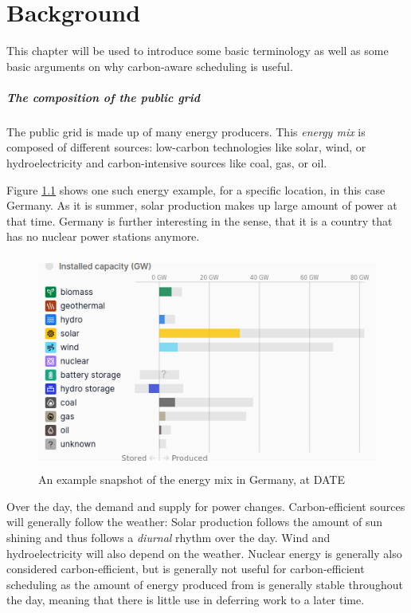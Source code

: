 \chapter{Background}

This chapter will be used to introduce some basic terminology as well as some basic arguments on why carbon-aware scheduling is useful.

\paragraph{The composition of the public grid}
The public grid is made up of many energy producers. This \emph{energy mix} is composed of different sources: low-carbon technologies like solar, wind, or hydroelectricity and carbon-intensive sources like coal, gas, or oil. 

Figure \ref{fig:energy_mix} shows one such energy example, for a specific location, in this case Germany.
As it is summer, solar production makes up large amount of power at that time. Germany is further interesting in the sense, that it is a country that has no nuclear power stations anymore.

\begin{figure}
    \includegraphics[width=\linewidth, height=200pt]{images/2_background2024-08-20-15-28-19.png}
    \caption[short]{An example snapshot of the energy mix in Germany, at DATE}
    \label{fig:energy_mix}
\end{figure}

Over the day, the demand and supply for power changes. Carbon-efficient sources will generally follow the weather: Solar production follows the amount of sun shining and thus follows a \emph{diurnal} rhythm over the day. Wind and hydroelectricity will also depend on the weather. 
Nuclear energy is generally also considered carbon-efficient, but is generally not useful for carbon-efficient scheduling as the amount of energy produced from is generally stable throughout  the day, meaning that there is little use in deferring work to a later time. 


